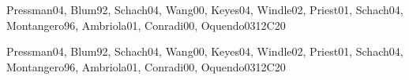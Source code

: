 \begin{syllabus}
\begin{unit}{\SESoftwareVerificationandValidation}{}{Pressman04, Blum92, Schach04, Wang00, Keyes04, Windle02, Priest01, Schach04, Montangero96, Ambriola01, Conradi00, Oquendo03}{12}{C20}
\begin{learningoutcomes}
    \item \SESoftwareVerificationandValidationLODiscussTheTesting[\Usage]
    \item \SESoftwareVerificationandValidationLOEvaluateAFor[\Usage]
    \item \SESoftwareVerificationandValidationLOCompareStatic[\Usage]
    \item \SESoftwareVerificationandValidationLOIdentifyTheOfDevelopment[\Usage]
    \item \SESoftwareVerificationandValidationLODiscussTheThe[\Usage]
    \item \SESoftwareVerificationandValidationLODescribeTechniquesVerification[\Usage]
    \item \SESoftwareVerificationandValidationLODescribeApproachesEstimation[\Usage]
    \item \SESoftwareVerificationandValidationLOEstimateThe[\Usage]
    \item \SESoftwareVerificationandValidationLOConductAn[\Usage]
\end{learningoutcomes}
\end{unit}

\begin{unit}{\SESoftwareEvolution}{}{Pressman04, Blum92, Schach04, Wang00, Keyes04, Windle02, Priest01, Schach04, Montangero96, Ambriola01, Conradi00, Oquendo03}{12}{C20}
\begin{topics}%
    \item \SESoftwareEvolutionTopicSoftware
    \item \SESoftwareEvolutionTopicSoftwareEvolution
    \item \SESoftwareEvolutionTopicCharacteristics
    \item \SESoftwareEvolutionTopicReengineering
    \item \SESoftwareEvolutionTopicSoftwareReuse
\end{topics}
\begin{learningoutcomes}
    \item \SESoftwareEvolutionLOIdentifyTheAssociatedEvolution[\Usage]
    \item \SESoftwareEvolutionLOEstimateTheA[\Usage]
    \item \SESoftwareEvolutionLOUseRefactoring[\Usage]
    \item \SESoftwareEvolutionLODiscussTheEvolving[\Usage]
    \item \SESoftwareEvolutionLOOutlineTheRegression[\Usage]
    \item \SESoftwareEvolutionLODiscussTheDisadvantagesTypes[\Usage]
\end{learningoutcomes}
\end{unit}


\end{syllabus}
